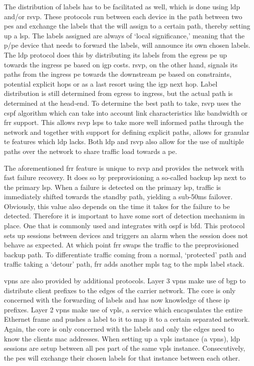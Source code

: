 The distribution of labels has to be facilitated as well, which is done using \ac{ldp} and/or \ac{rsvp}. These protocols run between each device in the path between two \acp{pe} and exchange the labels that the will assign to a certain path, thereby setting up a \ac{lsp}. The labels assigned are always of `local significance,' meaning that the \ac{p}/\ac{pe} device that needs to forward the labels, will announce its own chosen labels. The \ac{ldp} protocol does this by distributing its labels from the egress \ac{pe} up towards the ingress \ac{pe} based on \ac{igp} costs. \ac{rsvp}, on the other hand, signals its paths from the ingress \ac{pe} towards the downstream \ac{pe} based on constraints, potential explicit hops or as a last resort using the \ac{igp} next hop. Label distribution is still determined from egress to ingress, but the actual path is determined at the head-end. To determine the best path to take, \ac{rsvp} uses the \ac{cspf} algorithm which can take into account link characteristics like bandwidth or \ac{frr} support. This allows \ac{rsvp} \acp{lsp} to take more well informed paths through the network and together with support for defining explicit paths, allows for granular \ac{te} features which \ac{ldp} lacks. Both \ac{ldp} and \ac{rsvp} also allow for the use of multiple paths over the network to share traffic load towards a \ac{pe}.

The aforementioned \ac{frr} feature is unique to \ac{rsvp} and provides the network with fast failure recovery. It does so by preprovisioning a so-called backup \ac{lsp} next to the primary \ac{lsp}. When a failure is detected on the primary \ac{lsp}, traffic is immediately shifted towards the standby path, yielding a sub-50ms failover. Obviously, this value also depends on the time it takes for the failure to be detected. Therefore it is important to have some sort of detection mechanism in place. One that is commonly used and integrates with \ac{ospf} is \ac{bfd}. This protocol sets up sessions between devices and triggers an alarm when the session does not behave as expected. At which point \ac{frr} swaps the traffic to the preprovisioned backup path. To differentiate traffic coming from a normal, `protected' path and traffic taking a `detour' path, \ac{frr} adds another \ac{mpls} tag to the \ac{mpls} label stack.

\acp{vpn} are also provided by additional protocols. Layer 3 \acp{vpn} make use of \ac{bgp} to distribute client prefixes to the edges of the carrier network. The core is only concerned with the forwarding of labels and has now knowledge of these \acs{ip} prefixes. Layer 2 \acp{vpn} make use of \ac{vpls}, a service which encapsulates the entire Ethernet frame and pushes a label to it to map it to a certain separated network. Again, the core is only concerned with the labels and only the edges need to know the clients \acs{mac} addresses. When setting up a \ac{vpls} instance (a \acp{vpn}), \ac{ldp} sessions are setup between all \acp{pe} part of the same \ac{vpls} instance. Consecutively, the \acp{pe} will exchange their chosen labels for that instance between each other.

